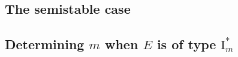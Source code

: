 \begin{remark}
\end{remark}
\subsection{The semistable case} \label{sec:the_semistable_case}


\subsection{Determining $m$ when $E$ is of type $\mathrm I_m^*$} \label{sec:determining_m_when_e_is_of_type_ims$}




